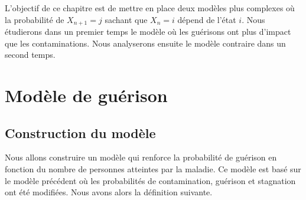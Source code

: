 \documentclass[12pt,a4paper]{report}
\theoremstyle{remark}
\begin{document}
L'objectif de ce chapitre est de mettre en place deux modèles plus complexes où la probabilité de $X_{n+1} = j$ sachant que $X_n = i$ dépend de l'état $i$. Nous étudierons dans un premier temps le modèle où les guérisons ont plus d'impact que les contaminations. Nous analyserons ensuite le modèle contraire dans un second temps.

\section{Modèle de guérison}
\subsection{Construction du modèle}
\vspace{0.6cm}

Nous allons construire un modèle qui renforce la probabilité de guérison en fonction du nombre de personnes atteintes par la maladie. Ce modèle est basé sur le modèle précédent où les probabilités de contamination, guérison et stagnation ont été modifiées. Nous avons alors la définition suivante.
\\
\end{document}
